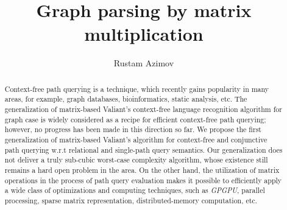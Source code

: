 \title{Graph parsing by matrix multiplication}


\author{Rustam Azimov}



\graphicspath{{Azimov/}}

\newtheorem{mytheorem}{Theorem}
\newtheorem{mydef}{Definition}
\renewcommand{\abstractname}{Abstract}
\renewcommand*{\proofname}{Proof}
\renewcommand*{\figurename}{Figure}
\renewcommand*{\tablename}{Table}
\renewcommand*{\refname}{References}

\maketitle

\begin{abstract}
Context-free path querying is a technique, which recently gains popularity in many areas, for example, graph databases, bioinformatics, static analysis, etc. The generalization of matrix-based Valiant's context-free language recognition algorithm for graph case is widely considered as a recipe for efficient context-free path querying; however, no progress has been made in this direction so far.
We propose the first generalization of matrix-based Valiant's algorithm for context-free and conjunctive path querying w.r.t relational and single-path query semantics. Our generalization does not deliver a truly sub-cubic worst-case complexity algorithm, whose existence still remains a hard open problem in the area. On the other hand, the utilization of matrix operations in the process of path query evaluation makes it possible to efficiently apply a wide class of optimizations and computing techniques, such as \textit{GPGPU}, parallel processing, sparse matrix representation, distributed-memory computation, etc.

\end{abstract}











  
  

